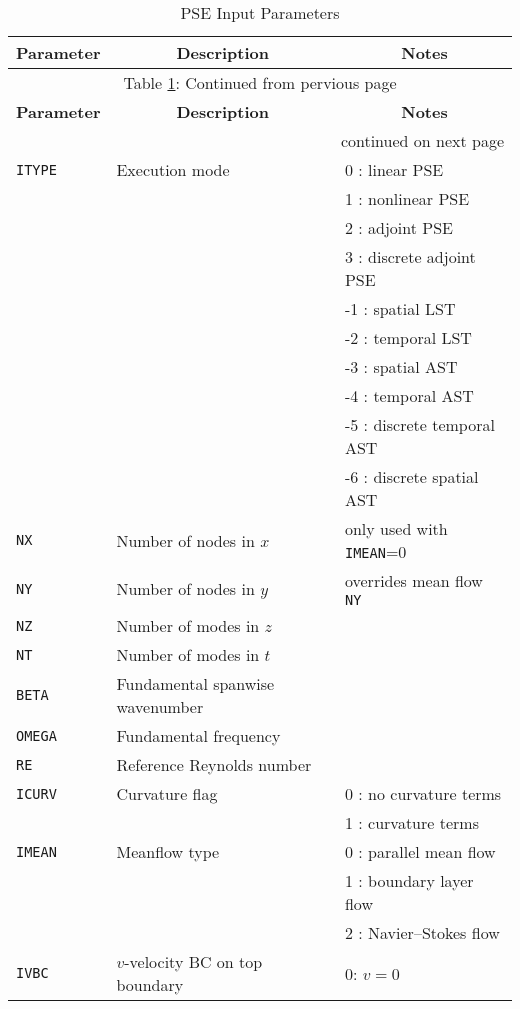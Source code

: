 \documentclass[10pt]{article}
\newcommand{\pse}{\textsf{PSE}\xspace}
\newcommand{\lst}{\textsf{LST}\xspace}
\renewcommand{\ast}{\textsf{AST}\xspace}
\begin{document}
\setlongtables
\begin{longtable}[c]{|l|l|l|}
\caption {\pse Input Parameters \label{t:parm}} \\
\hline
\multicolumn{1}{|l}{\textbf{Parameter}} & 
\multicolumn{1}{|c|}{\textbf{Description}} &
\multicolumn{1}{c|}{\textbf{Notes}} \\ 
\hline
\endfirsthead
\multicolumn{3}{c}{Table \ref{t:parm}: Continued from pervious page} \\[1ex]
\hline
\multicolumn{1}{|l}{\textbf{Parameter}} & 
\multicolumn{1}{|c|}{\textbf{Description}} &
\multicolumn{1}{c|}{\textbf{Notes}} \\ 
\hline
\endhead
\hline
\multicolumn{3}{r}{continued on next page} \\[1ex]
\endfoot
\hline
\endlastfoot
%
{\tt ITYPE} & Execution mode & 
     0 : linear \pse \\
& &  1 : nonlinear \pse \\
& &  2 : adjoint \pse \\
& &  3 : discrete adjoint \pse \\
& & -1 : spatial \lst \\
& & -2 : temporal \lst \\
& & -3 : spatial \ast \\
& & -4 : temporal \ast \\
& & -5 : discrete temporal \ast \\
& & -6 : discrete spatial  \ast \\
{\tt NX} & Number of nodes in $x$ & only used with {\tt IMEAN}=0 \\
{\tt NY} & Number of nodes in $y$ & overrides mean flow {\tt NY} \\
{\tt NZ} & Number of modes in $z$ & \\
{\tt NT} & Number of modes in $t$ & \\
{\tt BETA} & Fundamental spanwise wavenumber & \\
{\tt OMEGA} & Fundamental frequency& \\
{\tt RE} & Reference Reynolds number & \\
{\tt ICURV} & Curvature flag & 0 : no curvature terms \\
& & 1 : curvature terms \\
{\tt IMEAN} & Meanflow type & 0 : parallel mean flow \\
& & 1 : boundary layer flow \\
& & 2 : Navier--Stokes flow \\
{\tt IVBC} & $v$-velocity BC on top boundary & 0: $v = 0$ \\

\end{longtable}
\end{document}
